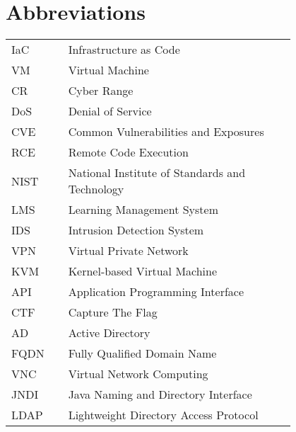 \chapter*{Abbreviations}

\begin{flushleft}
\begin{tabular}{l p{0.8\linewidth}}
IaC      & Infrastructure as Code\\
VM       & Virtual Machine\\
CR       & Cyber Range\\
DoS      & Denial of Service\\
CVE      & Common Vulnerabilities and Exposures\\
RCE      & Remote Code Execution\\
NIST     & National Institute of Standards and Technology\\
LMS      & Learning Management System\\
IDS      & Intrusion Detection System\\
VPN      & Virtual Private Network\\
KVM      & Kernel-based Virtual Machine\\
API      & Application Programming Interface\\
CTF      & Capture The Flag\\
AD       & Active Directory\\
FQDN     & Fully Qualified Domain Name\\
VNC      & Virtual Network Computing\\
JNDI     & Java Naming and Directory Interface\\
LDAP     & Lightweight Directory Access Protocol
\end{tabular}
\end{flushleft}